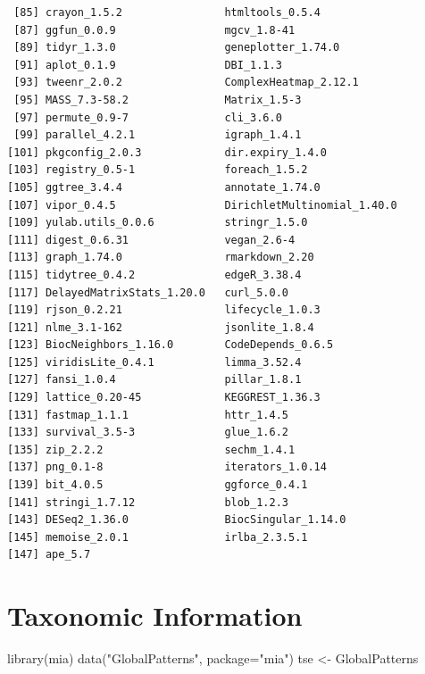 \documentclass[
]{book}
\newenvironment{Shaded}{\begin{snugshade}}{\end{snugshade}}
\newcommand{\AttributeTok}[1]{\textcolor[rgb]{0.77,0.63,0.00}{#1}}
\newcommand{\FunctionTok}[1]{\textcolor[rgb]{0.00,0.00,0.00}{#1}}
\newcommand{\NormalTok}[1]{#1}
\newcommand{\OtherTok}[1]{\textcolor[rgb]{0.56,0.35,0.01}{#1}}
\newcommand{\StringTok}[1]{\textcolor[rgb]{0.31,0.60,0.02}{#1}}
\begin{document}
\begin{verbatim}
 [85] crayon_1.5.2                htmltools_0.5.4            
 [87] ggfun_0.0.9                 mgcv_1.8-41                
 [89] tidyr_1.3.0                 geneplotter_1.74.0         
 [91] aplot_0.1.9                 DBI_1.1.3                  
 [93] tweenr_2.0.2                ComplexHeatmap_2.12.1      
 [95] MASS_7.3-58.2               Matrix_1.5-3               
 [97] permute_0.9-7               cli_3.6.0                  
 [99] parallel_4.2.1              igraph_1.4.1               
[101] pkgconfig_2.0.3             dir.expiry_1.4.0           
[103] registry_0.5-1              foreach_1.5.2              
[105] ggtree_3.4.4                annotate_1.74.0            
[107] vipor_0.4.5                 DirichletMultinomial_1.40.0
[109] yulab.utils_0.0.6           stringr_1.5.0              
[111] digest_0.6.31               vegan_2.6-4                
[113] graph_1.74.0                rmarkdown_2.20             
[115] tidytree_0.4.2              edgeR_3.38.4               
[117] DelayedMatrixStats_1.20.0   curl_5.0.0                 
[119] rjson_0.2.21                lifecycle_1.0.3            
[121] nlme_3.1-162                jsonlite_1.8.4             
[123] BiocNeighbors_1.16.0        CodeDepends_0.6.5          
[125] viridisLite_0.4.1           limma_3.52.4               
[127] fansi_1.0.4                 pillar_1.8.1               
[129] lattice_0.20-45             KEGGREST_1.36.3            
[131] fastmap_1.1.1               httr_1.4.5                 
[133] survival_3.5-3              glue_1.6.2                 
[135] zip_2.2.2                   sechm_1.4.1                
[137] png_0.1-8                   iterators_1.0.14           
[139] bit_4.0.5                   ggforce_0.4.1              
[141] stringi_1.7.12              blob_1.2.3                 
[143] DESeq2_1.36.0               BiocSingular_1.14.0        
[145] memoise_2.0.1               irlba_2.3.5.1              
[147] ape_5.7                    
\end{verbatim}

\hypertarget{taxonomic-information}{%
\chapter{Taxonomic Information}\label{taxonomic-information}}

\begin{Shaded}
\begin{Highlighting}[]
\FunctionTok{library}\NormalTok{(mia)}
\FunctionTok{data}\NormalTok{(}\StringTok{"GlobalPatterns"}\NormalTok{, }\AttributeTok{package=}\StringTok{"mia"}\NormalTok{)}
\NormalTok{tse }\OtherTok{\textless{}{-}}\NormalTok{ GlobalPatterns }
\end{Highlighting}
\end{Shaded}
\end{document}
